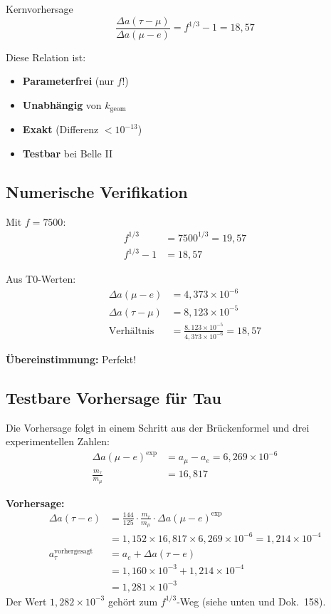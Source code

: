 	\begin{important}{Kernvorhersage}
		\begin{equation}
			\boxed{\frac{\Delta a(\tau - \mu)}{\Delta a(\mu - e)} = f^{1/3} - 1 = 18{,}57}
		\end{equation}
		
		Diese Relation ist:
		\begin{itemize}
			\item \textbf{Parameterfrei} (nur $f$!)
			\item \textbf{Unabhängig} von $k_{\text{geom}}$
			\item \textbf{Exakt} (Differenz $< 10^{-13}$)
			\item \textbf{Testbar} bei Belle II
		\end{itemize}
	\end{important}
	
	\subsection{Numerische Verifikation}
	
	Mit $f = 7500$:
	\begin{align}
		f^{1/3} &= 7500^{1/3} = 19{,}57 \\
		f^{1/3} - 1 &= 18{,}57
	\end{align}
	
	Aus T0-Werten:
	\begin{align}
		\Delta a(\mu - e) &= 4{,}373 \times 10^{-6} \\
		\Delta a(\tau - \mu) &= 8{,}123 \times 10^{-5} \\
		\text{Verhältnis} &= \frac{8{,}123 \times 10^{-5}}{4{,}373 \times 10^{-6}} = 18{,}57
	\end{align}
	
	\textbf{Übereinstimmung:} Perfekt! \checkmark{}\checkmark{}\checkmark{}
	
	\subsection{Testbare Vorhersage für Tau}
	
	Die Vorhersage folgt in einem Schritt aus der Brückenformel und drei experimentellen Zahlen:
	\begin{align}
		\Delta a(\mu - e)^{\text{exp}} &= a_\mu - a_e = 6{,}269 \times 10^{-6} \\
		\frac{m_\tau}{m_\mu} &= 16{,}817
	\end{align}
	
	\textbf{Vorhersage:}
	\begin{align}
		\Delta a(\tau - e) &= \frac{144}{125} \cdot \frac{m_\tau}{m_\mu} \cdot \Delta a(\mu - e)^{\text{exp}} \\
		&= 1{,}152 \times 16{,}817 \times 6{,}269 \times 10^{-6} = 1{,}214 \times 10^{-4} \\
		a_\tau^{\text{vorhergesagt}} &= a_e + \Delta a(\tau - e) \\
		&= 1{,}160 \times 10^{-3} + 1{,}214 \times 10^{-4} \\
		&= \boxed{1{,}281 \times 10^{-3}}
	\end{align}
	Der Wert $1{,}282 \times 10^{-3}$ gehört zum $f^{1/3}$-Weg (siehe unten und Dok.~158).
	
